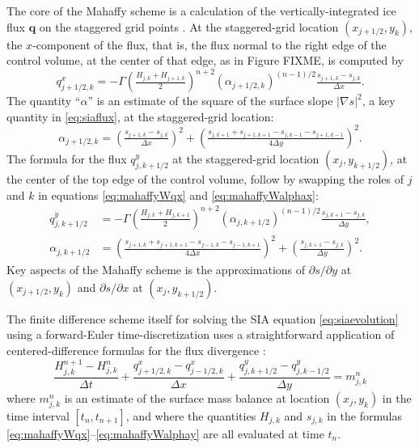 \documentclass[11pt]{amsart}
\newcommand\bq{\mathbf{q}}
\newcommand{\grad}{\nabla}
\begin{document}
The core of the Mahaffy scheme is a calculation of the vertically-integrated ice flux $\bq$ on the staggered grid points \cite[equations (19), (20)]{Mahaffy1976}.  At the staggered-grid location $(x_{j+1/2},y_k)$, the $x$-component of the flux, that is, the flux normal to the right edge of the control volume, at the center of that edge, as in Figure FIXME, is computed by
\begin{equation}
q^x_{j+1/2,k} = - \Gamma \left(\tfrac{H_{j,k} + H_{j+1,k}}{2}\right)^{n+2} \left(\alpha_{j+1/2,k}\right)^{(n-1)/2} \tfrac{s_{j+1,k} - s_{j,k}}{\Delta x}.  \label{eq:mahaffyWqx}
\end{equation}
The quantity ``$\alpha$'' is an estimate of the square of the surface slope $|\grad s|^2$, a key quantity in \eqref{eq:siaflux}, at the staggered-grid location:
\begin{equation}
\alpha_{j+1/2,k} = \left(\tfrac{s_{j+1,k} - s_{j,k}}{\Delta x}\right)^2 + \left(\tfrac{s_{j,k+1} + s_{j+1,k+1} - s_{j,k-1} - s_{j+1,k-1}}{4 \Delta y}\right)^2.  \label{eq:mahaffyWalphax}
\end{equation}
The formula for the flux $q^y_{j,k+1/2}$ at the staggered-grid location $(x_j,y_{k+1/2})$, at the center of the top edge of the control volume, follow by swapping the roles of $j$ and $k$ in equations \eqref{eq:mahaffyWqx} and \eqref{eq:mahaffyWalphax}:
\begin{align}
q^y_{j,k+1/2} &= - \Gamma \left(\tfrac{H_{j,k} + H_{j,k+1}}{2}\right)^{n+2} \left(\alpha_{j,k+1/2}\right)^{(n-1)/2} \tfrac{s_{j,k+1} - s_{j,k}}{\Delta y}, \label{eq:mahaffyWqy} \\
\alpha_{j,k+1/2} &= \left(\tfrac{s_{j+1,k} + s_{j+1,k+1} - s_{j-1,k} - s_{j-1,k+1}}{4 \Delta x}\right)^2 + \left(\tfrac{s_{j,k+1} - s_{j,k}}{\Delta y}\right)^2.  \label{eq:mahaffyWalphay}
\end{align}
Key aspects of the Mahaffy scheme is the approximations of $\partial s/\partial y$ at $(x_{j+1/2},y_k)$ and $\partial s/\partial x$ at $(x_j,y_{k+1/2})$.

The finite difference scheme itself for solving the SIA equation \eqref{eq:siaevolution} using a forward-Euler time-discretization uses a straightforward application of centered-difference formulas for the flux divergence \cite{MortonMayers2005}:
\begin{equation}
\frac{H_{j,k}^{n+1} - H_{j,k}^n}{\Delta t} + \frac{q^x_{j+1/2,k} - q^x_{j-1/2,k}}{\Delta x} + \frac{q^y_{j,k+1/2}- q^y_{j,k-1/2}}{\Delta y} = m_{j,k}^n
\end{equation}
where $m_{j,k}^n$ is an estimate of the surface mass balance at location $(x_j,y_k)$ in the time interval $[t_n,t_{n+1}]$, and where the quantities $H_{j,k}$ and $s_{j,k}$ in the formulas \eqref{eq:mahaffyWqx}--\eqref{eq:mahaffyWalphay} are all evaluated at time $t_n$.
\end{document}
